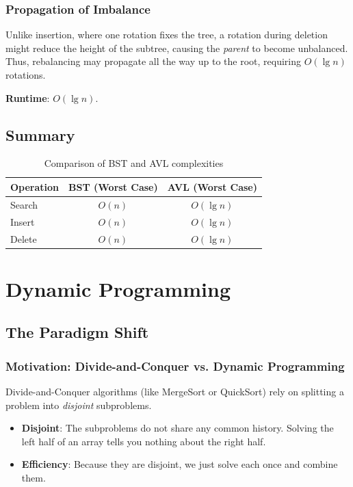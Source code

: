\documentclass[12pt]{article}
\theoremstyle{blueplain}
\theoremstyle{bluedef}
\theoremstyle{blueremark}
\begin{document}
\subsubsection{Propagation of Imbalance}
Unlike insertion, where one rotation fixes the tree, a rotation during deletion might reduce the height of the subtree, causing the \textit{parent} to become unbalanced.
Thus, rebalancing may propagate all the way up to the root, requiring $O(\lg n)$ rotations.

\noindent \textbf{Runtime}: $O(\lg n)$.

\subsection{Summary}
\begin{table}[h]
    \centering
    \begin{tabular}{|l|c|c|}
        \hline
        \textbf{Operation} & \textbf{BST (Worst Case)} & \textbf{AVL (Worst Case)} \\ \hline
        Search             & $O(n)$                    & $O(\lg n)$                \\ \hline
        Insert             & $O(n)$                    & $O(\lg n)$                \\ \hline
        Delete             & $O(n)$                    & $O(\lg n)$                \\ \hline
    \end{tabular}
    \caption{Comparison of BST and AVL complexities}
\end{table}

\clearpage


\section{Dynamic Programming}

\subsection{The Paradigm Shift}

\subsubsection{Motivation: Divide-and-Conquer vs. Dynamic Programming}
Divide-and-Conquer algorithms (like MergeSort or QuickSort) rely on splitting a problem into \textit{disjoint} subproblems.
\begin{itemize}
    \item \textbf{Disjoint}: The subproblems do not share any common history. Solving the left half of an array tells you nothing about the right half.
    \item \textbf{Efficiency}: Because they are disjoint, we just solve each once and combine them.
\end{itemize}
\end{document}
